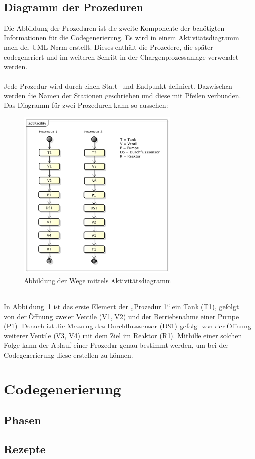 \subsection{Diagramm der Prozeduren}
Die Abbildung der Prozeduren ist die zweite Komponente der benötigten Informationen für die Codegenerierung. Es wird in einem Aktivitätsdiagramm nach der UML Norm erstellt. Dieses enthält die Prozedere, die später codegeneriert und im weiteren Schritt in der Chargenprozessanlage verwendet werden. \\\\
Jede Prozedur wird durch einen Start- und Endpunkt definiert. Dazwischen werden die Namen der Stationen geschrieben und diese mit Pfeilen verbunden. Das Diagramm für zwei Prozeduren kann so aussehen: 
\begin{figure}[h!]
		\centering
		\includegraphics[width=0.7\textwidth]{graphics/konzept/UML_Activity.png}
		\caption{Abbildung der Wege mittels Aktivitätsdiagramm}
		\label{fig:konz_UML_Activity}
\end{figure}\\
In Abbildung~\ref{fig:konz_UML_Activity} ist das erste Element der „Prozedur 1“ ein Tank (T1), gefolgt von der Öffnung zweier Ventile (V1, V2) und der Betriebsnahme einer Pumpe (P1). Danach ist die Messung des Durchflusssensor (DS1) gefolgt von der Öffnung weiterer Ventile (V3, V4) mit dem Ziel im Reaktor (R1). 
Mithilfe einer solchen Folge kann der Ablauf einer Prozedur genau bestimmt werden, um bei der Codegenerierung diese erstellen zu können. 
\section{Codegenerierung}
\subsection{Phasen}
\subsection{Rezepte}

